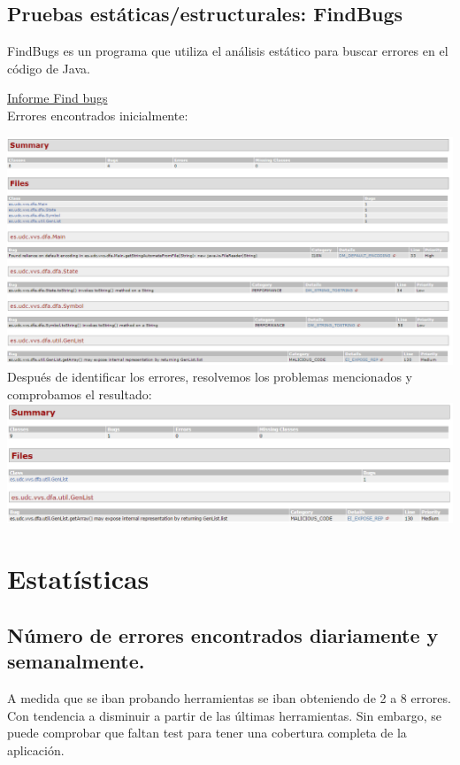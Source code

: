 \documentclass[DIV=calc,paper=a4,fontsize=11pt,onecolumn]{scrartcl} %
\newcommand{\hint}[1]{\begin{quote}\itshape #1 \end{quote}}
\begin{document}
	\subsection{Pruebas estáticas/estructurales: FindBugs}
	
	FindBugs es un programa que utiliza el análisis estático para buscar errores en el código de Java.
	
	\href{Informes/findBugs-report/findbugs.html}{Informe Find bugs} \\
	
	Errores encontrados inicialmente:
	
	\includegraphics[width=15cm]{Imagenes/findBugs1.png} \\
	
	Después de identificar los errores, resolvemos los problemas mencionados y comprobamos el resultado:\\
	
	\includegraphics[width=15cm]{Imagenes/findBugs2.png} \\

\section{Estatísticas}

  
  	\subsection{Número de errores encontrados diariamente y semanalmente.}
  	A medida que se iban probando herramientas se iban obteniendo de 2 a 8 errores. Con tendencia a disminuir a partir de las últimas herramientas. Sin embargo, se puede comprobar que faltan test para tener una cobertura completa de la aplicación.
  	
\end{document}
